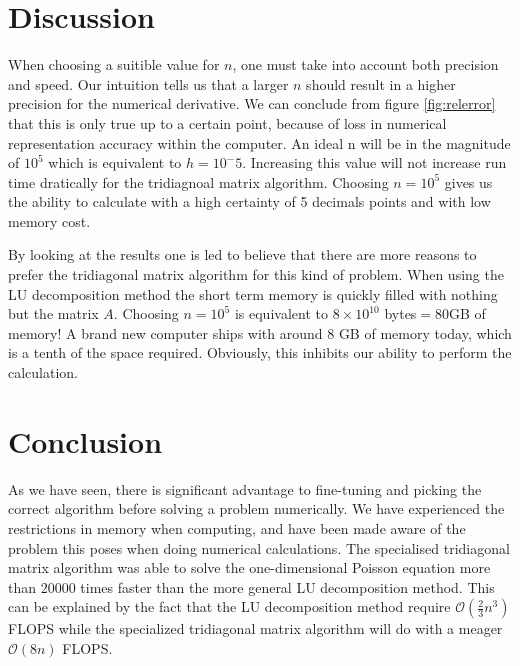 \documentclass[10pt, a4paper]{amsart}
\begin{document}
\section{Discussion}
When choosing a suitible value for $n$, one must take into account both precision and speed. Our intuition tells us that a larger $n$ should result in a higher precision for the numerical derivative. We can conclude from figure \ref{fig:relerror} that this is only true up to a certain point, because of loss in numerical representation accuracy within the computer. An ideal n will be in the magnitude of $10^5$ which is equivalent to $h=10^-5$. Increasing this value will not increase run time dratically for the tridiagnoal matrix algorithm. Choosing $n=10^5$ gives us the ability to calculate with a high certainty of 5 decimals points and with low memory cost. 

By looking at the results one is led to believe that there are more reasons to prefer the tridiagonal matrix algorithm for this kind of problem. When using the LU decomposition method the short term memory is quickly filled with nothing but the matrix $A$. Choosing $n=10^5$ is equivalent to $8\times10^{10}$ bytes$=80$GB of memory! A brand new computer ships with around $8$ GB of memory today, which is a tenth of the space required. Obviously, this inhibits our ability to perform the calculation. 

\section{Conclusion}
As we have seen, there is significant advantage to fine-tuning and picking the correct algorithm before solving a problem numerically. We have experienced the restrictions in memory when computing, and have been made aware of the problem this poses when doing numerical calculations. The specialised tridiagonal matrix algorithm was able to solve the one-dimensional Poisson equation more than $20000$ times faster than the more general LU decomposition method. This can be explained by the fact that the LU decomposition method require $\mathcal{O}(\frac{2}{3}n^3)$ FLOPS while the specialized tridiagonal matrix algorithm will do with a meager $\mathcal{O}(8n)$ FLOPS.

\begin{thebibliography}{10}
\end{thebibliography}
\end{document}
